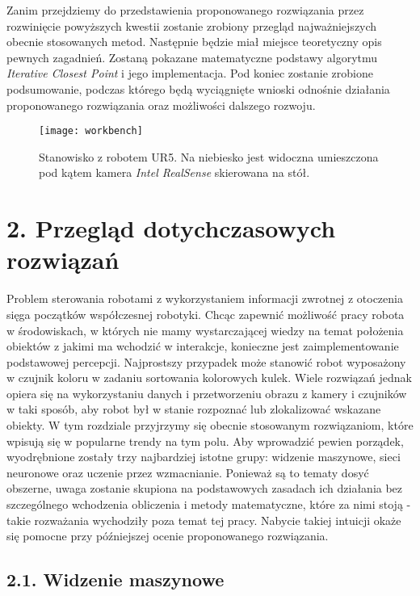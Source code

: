 \documentclass{article}
\begin{document}
Zanim przejdziemy do przedstawienia proponowanego rozwiązania przez rozwinięcie powyższych kwestii zostanie zrobiony przegląd najważniejszych obecnie stosowanych metod. Następnie będzie miał miejsce teoretyczny opis pewnych zagadnień. Zostaną pokazane matematyczne podstawy algorytmu \emph{Iterative Closest Point} i jego implementacja. Pod koniec zostanie zrobione podsumowanie, podczas którego będą wyciągnięte wnioski odnośnie działania proponowanego rozwiązania oraz możliwości dalszego rozwoju.

\begin{figure}[h]
\centering
\texttt{[image: workbench]}
\caption{Stanowisko z robotem UR5. Na niebiesko jest widoczna umieszczona pod kątem kamera \emph{Intel RealSense} skierowana na stół.}
\end{figure}

\newpage
\section*{\LARGE{2. Przegląd dotychczasowych rozwiązań}} 

Problem sterowania robotami z wykorzystaniem informacji zwrotnej z otoczenia sięga początków współczesnej robotyki. Chcąc zapewnić możliwość pracy robota w środowiskach, w których nie mamy wystarczającej wiedzy na temat położenia obiektów z jakimi ma wchodzić w interakcje, konieczne jest zaimplementowanie podstawowej percepcji. Najprostszy przypadek może stanowić robot wyposażony w czujnik koloru w zadaniu sortowania kolorowych kulek. Wiele rozwiązań jednak opiera się na wykorzystaniu danych i przetworzeniu obrazu z kamery i czujników w taki sposób, aby robot był w stanie rozpoznać lub zlokalizować wskazane obiekty. W tym rozdziale przyjrzymy się obecnie stosowanym rozwiązaniom, które wpisują się w popularne trendy na tym polu. Aby wprowadzić pewien porządek, wyodrębnione zostały trzy najbardziej istotne grupy: widzenie maszynowe, sieci neuronowe oraz uczenie przez wzmacnianie. Ponieważ są to tematy dosyć obszerne, uwaga zostanie skupiona na podstawowych zasadach ich działania bez szczególnego wchodzenia obliczenia i metody matematyczne, które za nimi stoją - takie rozważania wychodziły poza temat tej pracy. Nabycie takiej intuicji okaże się pomocne przy późniejszej ocenie proponowanego rozwiązania.

\subsection*{\LARGE{2.1. Widzenie maszynowe}} 
\end{document}
